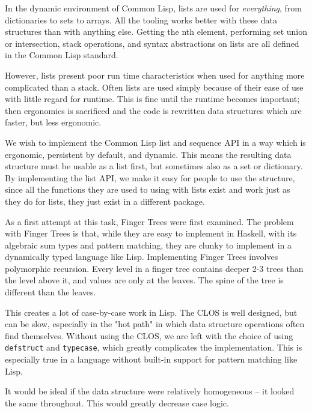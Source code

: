 \documentclass[sigconf]{acmart}
\begin{document}
In the dynamic environment of Common Lisp, lists are used for  \emph{everything}, from
dictionaries to sets to arrays. All the tooling works better with these data
structures than with anything else. Getting the nth element, performing set
union or intersection, stack operations, and syntax abstractions on lists are
all defined in the Common Lisp standard.

However, lists present poor run time characteristics when used for anything more
complicated than a stack. Often lists are used simply because of their ease of
use with little regard for runtime. This is fine until the runtime becomes
important; then ergonomics is sacrificed and the code is rewritten data
structures which are faster, but less ergonomic.

We wish to implement the Common Lisp list and sequence API in a way which is
ergonomic, persistent by default, and dynamic. This means the resulting data
structure must be usable as a list first, but sometimes also as a set or
dictionary. By implementing the list API, we make it easy for people to use the
structure, since all the functions they are used to using with lists exist and
work just as they do for lists, they just exist in a different package.

As a first attempt at this task, Finger Trees\cite{Hinze-Paterson:FingerTree}
were first examined. The problem with Finger Trees is that, while they are easy
to implement in Haskell, with its algebraic sum types and pattern matching, they
are clunky to implement in a dynamically typed language like Lisp. Implementing
Finger Trees involves polymorphic recursion. Every level in a finger tree
contains deeper 2-3 trees than the level above it, and values are only at the
leaves. The spine of the tree is different than the leaves.

This creates a lot of case-by-case work in Lisp. The CLOS is well designed, but
can be slow, especially in the "hot path" in which data structure operations
often find themselves. Without using the CLOS, we are left with the choice of
using \texttt{defstruct} and \texttt{typecase}, which greatly complicates the implementation.
This is especially true in a language without built-in support for pattern
matching like Lisp.

It would be ideal if the data structure were relatively homogeneous -- it looked
the same throughout. This would greatly decrease case logic.
\end{document}
